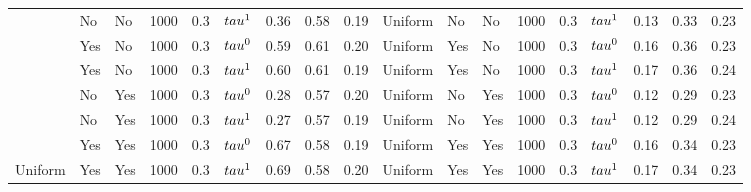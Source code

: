 \begin{tabular}[t]{lllrrlrrrlllrrlrrr}
 & No & No & 1000 & 0.3 & $\\tau^1$ & 0.36 & 0.58 & 0.19 & Uniform & No & No & 1000 & 0.3 & $\\tau^1$ & 0.13 & 0.33 & 0.23\\

 & Yes & No & 1000 & 0.3 & $\\tau^0$ & 0.59 & 0.61 & 0.20 & Uniform & Yes & No & 1000 & 0.3 & $\\tau^0$ & 0.16 & 0.36 & 0.23\\

 & Yes & No & 1000 & 0.3 & $\\tau^1$ & 0.60 & 0.61 & 0.19 & Uniform & Yes & No & 1000 & 0.3 & $\\tau^1$ & 0.17 & 0.36 & 0.24\\

 & No & Yes & 1000 & 0.3 & $\\tau^0$ & 0.28 & 0.57 & 0.20 & Uniform & No & Yes & 1000 & 0.3 & $\\tau^0$ & 0.12 & 0.29 & 0.23\\

 & No & Yes & 1000 & 0.3 & $\\tau^1$ & 0.27 & 0.57 & 0.19 & Uniform & No & Yes & 1000 & 0.3 & $\\tau^1$ & 0.12 & 0.29 & 0.24\\

 & Yes & Yes & 1000 & 0.3 & $\\tau^0$ & 0.67 & 0.58 & 0.19 & Uniform & Yes & Yes & 1000 & 0.3 & $\\tau^0$ & 0.16 & 0.34 & 0.23\\

\multirow{-8}{*}{\raggedright\arraybackslash Uniform} & Yes & Yes & 1000 & 0.3 & $\\tau^1$ & 0.69 & 0.58 & 0.20 & Uniform & Yes & Yes & 1000 & 0.3 & $\\tau^1$ & 0.17 & 0.34 & 0.23\\
\bottomrule
\end{tabular}
